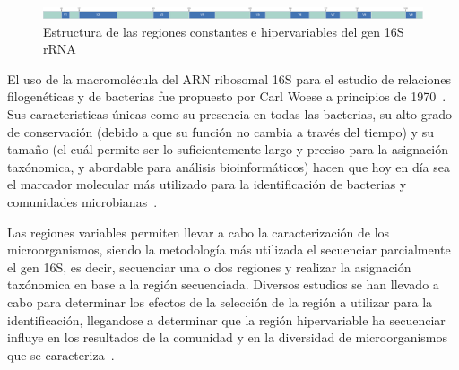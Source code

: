 
\begin{figure}[H]
    \centering
    \includegraphics[width=1\linewidth]{images/16s_diagram-2.pdf}
    \caption{Estructura de las regiones constantes e hipervariables del gen 16S rRNA}
    \label{fig:16S_structure}
\end{figure}


El uso de la macromolécula del ARN ribosomal  16S para el estudio de relaciones filogenéticas y de bacterias fue propuesto por Carl Woese a principios de 1970~\cite{olsen1993ribosomal}.
Sus caracteristicas únicas como su presencia en todas las bacterias, su alto grado de conservación (debido a que su función no cambia a través del tiempo) y su tamaño (el cuál permite ser lo suficientemente largo y preciso para la asignación taxónomica, y abordable para análisis bioinformáticos) hacen que hoy en día sea el marcador molecular más utilizado para la identificación de bacterias y comunidades microbianas~\cite{reller2007detection,janda200716s,lopez2023determining,patel200116s}.


Las regiones variables permiten llevar a cabo la caracterización de los microorganismos, siendo la metodología más utilizada el secuenciar parcialmente el gen 16S, es decir, secuenciar una o dos regiones y realizar la asignación taxónomica en base a la región secuenciada. Diversos estudios se han llevado a cabo para determinar los efectos de la selección de la región a utilizar para la identificación, llegandose a determinar que la región hipervariable ha secuenciar influye en los resultados de la comunidad y en la diversidad de microorganismos que se caracteriza~\cite{klindworth2013evaluation,mizrahi2013taxonomic,guo2013taxonomic,soergel2012selection}.

